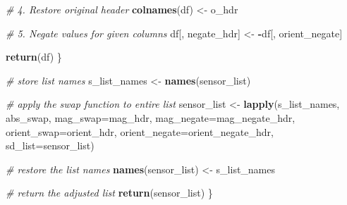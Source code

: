 \documentclass[]{article}
\newenvironment{Shaded}{\begin{snugshade}}{\end{snugshade}}
\newcommand{\CommentTok}[1]{\textcolor[rgb]{0.56,0.35,0.01}{\textit{#1}}}
\newcommand{\DataTypeTok}[1]{\textcolor[rgb]{0.13,0.29,0.53}{#1}}
\newcommand{\KeywordTok}[1]{\textcolor[rgb]{0.13,0.29,0.53}{\textbf{#1}}}
\newcommand{\NormalTok}[1]{#1}
\newcommand{\OperatorTok}[1]{\textcolor[rgb]{0.81,0.36,0.00}{\textbf{#1}}}
\newcommand{\StringTok}[1]{\textcolor[rgb]{0.31,0.60,0.02}{#1}}
\begin{document}
\begin{Shaded}
\begin{Highlighting}[]
    \CommentTok{# 4. Restore original header}
    \KeywordTok{colnames}\NormalTok{(df) <-}\StringTok{ }\NormalTok{o_hdr}
    
    \CommentTok{# 5. Negate values for given columns}
\NormalTok{    df[, negate_hdr] <-}\StringTok{ }\OperatorTok{-}\NormalTok{df[, orient_negate]}
    
    \KeywordTok{return}\NormalTok{(df)}
\NormalTok{  \}}
  
  \CommentTok{# store list names}
\NormalTok{  s_list_names <-}\StringTok{ }\KeywordTok{names}\NormalTok{(sensor_list)}
  
  \CommentTok{# apply the swap function to entire list}
\NormalTok{  sensor_list <-}\StringTok{ }\KeywordTok{lapply}\NormalTok{(s_list_names, }
\NormalTok{                        abs_swap, }
                        \DataTypeTok{mag_swap=}\NormalTok{mag_hdr,}
                        \DataTypeTok{mag_negate=}\NormalTok{mag_negate_hdr,}
                        \DataTypeTok{orient_swap=}\NormalTok{orient_hdr, }
                        \DataTypeTok{orient_negate=}\NormalTok{orient_negate_hdr, }
                        \DataTypeTok{sd_list=}\NormalTok{sensor_list)}
  
  \CommentTok{# restore the list names}
  \KeywordTok{names}\NormalTok{(sensor_list) <-}\StringTok{ }\NormalTok{s_list_names}
  
  \CommentTok{# return the adjusted list}
  \KeywordTok{return}\NormalTok{(sensor_list)}
\NormalTok{\}}
\end{Highlighting}
\end{Shaded}
\end{document}
